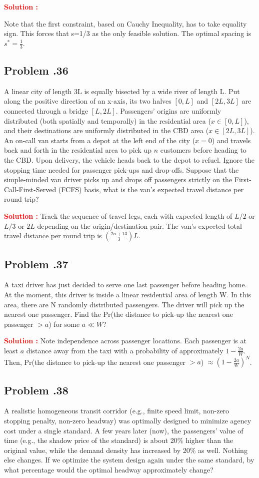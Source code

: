 \documentclass[12pt]{article}
\newcommand{\customsubsection}[1]{
  \subsection*{Problem \thesection.#1}
}
\begin{document}
\textbf{\textcolor{red}{Solution :}} 

Note that the first constraint, based on Cauchy Inequality, has to take equality sign. This forces that s=1/3 as the only feasible solution. 
The optimal spacing is $s^*=\frac{1}{3}$.\\ 


\newpage


\customsubsection{36}
A linear city of length 3L is equally bisected by a wide river of length L. Put along the positive direction of an x-axis, its two halves $[0, L]$ and $[2L, 3L]$ are connected through a bridge $[L, 2L]$. Passengers' origins are uniformly distributed (both spatially and temporally) in the residential area ($x\in[0,L]$), and their destinations are uniformly distributed in the CBD area ($x\in[2L,3L]$). An on-call van starts from a depot at the left end of the city ($x=0$) and travels back and forth in the residential area to pick up $n$ customers before heading to the CBD. Upon delivery, the vehicle heads back to the depot to refuel. Ignore the stopping time needed for passenger pick-ups and drop-offs. Suppose that the simple-minded van driver picks up and drops off passengers strictly on the First-Call-First-Served (FCFS) basis, what is the van’s expected travel distance per round trip?


\textbf{\textcolor{red}{Solution :}} 
Track the sequence of travel legs, each with expected length of $L/2$ or $L/3$ or $2L$ depending on the origin/destination pair.
The van’s expected total travel distance per round trip is $\left( \frac{2n+13}{3}\right)L$.\\

\newpage

\customsubsection{37}
A taxi driver has just decided to serve one last passenger before heading home. At the moment, this driver is inside a linear residential area of length W. In this area, there are N randomly distributed passengers. The driver will pick up the nearest one passenger. Find the Pr(the distance to pick-up the nearest one passenger $> a$) for some $a\ll W$? 


\textbf{\textcolor{red}{Solution :}} 
Note independence across passenger locations. Each passenger is at least $a$ distance away from the taxi with a probability of approximately $1- \frac{2a}{W}$. Then,
Pr(the distance to pick-up the nearest one passenger $> a$) \(  \approx \left( 1- \frac{2a}{W}\right)^N\).


\newpage


\customsubsection{38}
A realistic homogeneous transit corridor (e.g., finite speed limit, non-zero stopping penalty, non-zero headway) was optimally designed to minimize agency cost under a single standard. A few years later (now), the passengers’ value of time (e.g., the shadow price of the standard) is about 20\% higher than the original value, while the demand density has increased by 20\% as well. Nothing else changes. If we optimize the system design again under the same standard, by what percentage would the optimal headway approximately change?
\end{document}
